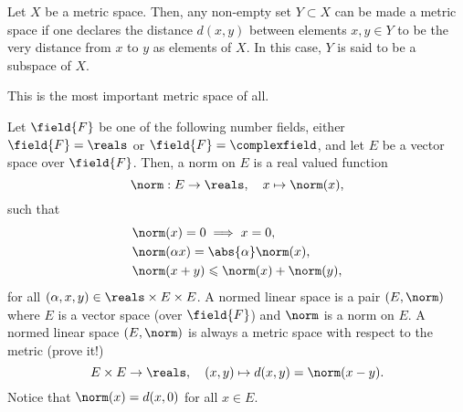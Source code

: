 \begin{example}\label{example:subspaces}
  Let \(X\) be a metric space. Then, any non-empty set \(Y\subset{X}\) can be
  made a metric space if one declares the distance \(d(x,y)\) between elements
  \(x,y\in{Y}\) to be the very distance from \(x\) to \(y\) as elements of
  \(X\). In this case, \(Y\) is said to be a subspace of \(X\).
\end{example}

\begin{example}\label{example:the-real-line}
  This is the most important metric space of all.
\end{example}

\begin{example}\label{example:normed-linear-spaces}
  Let \(\field{F}\) be one of the following number fields, either
  \(\field{F}=\reals\) or \(\field{F}=\complexfield\), and let \(E\) be a
  vector space over \(\field{F}\). Then, a norm on \(E\) is a real valued
  function
  \[
    \norm:E\to\reals,\quad{x\mapsto\norm(x)},
  \]
  such that
  \begin{align}
    &\norm(x)=0\implies{x=0},               \\
    &\norm(\alpha{x})=\abs{\alpha}\norm(x), \\
    &\norm(x+y)\leqslant{\norm(x)+\norm(y)},
  \end{align}
  for all \((\alpha,x,y)\in\reals\times{E}\times{E}\). A normed linear space is
  a pair \((E,\norm)\) where \(E\) is a vector space (over \(\field{F}\)) and
  \(\norm\) is a norm on \(E\). A normed linear space \((E,\norm)\) is always a
  metric space with respect to the metric (prove it!)
  \[
    E\times{E}\to\reals,\quad{(x,y)\mapsto{d(x,y)=\norm(x-y)}}.
  \]
  Notice that \(\norm(x)=d(x,0)\) for all \(x\in{E}\).
\end{example}

